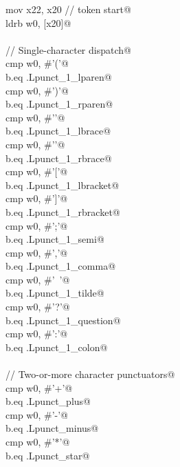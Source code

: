 \documentclass[11pt,a4paper,twoside,openright,DIV=15]{scrbook}
\theoremstyle{definition}
\theoremstyle{plain}
\theoremstyle{remark}
\begin{document}
\begin{flushleft}
\begin{minipage}{\linewidth}
\begin{list}{}{}
\mbox{}\verb@    mov x22, x20                // token start@\\
\mbox{}\verb@    ldrb w0, [x20]@\\
\mbox{}\verb@@\\
\mbox{}\verb@    // Single-character dispatch@\\
\mbox{}\verb@    cmp w0, #'('@\\
\mbox{}\verb@    b.eq .Lpunct_1_lparen@\\
\mbox{}\verb@    cmp w0, #')'@\\
\mbox{}\verb@    b.eq .Lpunct_1_rparen@\\
\mbox{}\verb@    cmp w0, #'{'@\\
\mbox{}\verb@    b.eq .Lpunct_1_lbrace@\\
\mbox{}\verb@    cmp w0, #'}'@\\
\mbox{}\verb@    b.eq .Lpunct_1_rbrace@\\
\mbox{}\verb@    cmp w0, #'['@\\
\mbox{}\verb@    b.eq .Lpunct_1_lbracket@\\
\mbox{}\verb@    cmp w0, #']'@\\
\mbox{}\verb@    b.eq .Lpunct_1_rbracket@\\
\mbox{}\verb@    cmp w0, #';'@\\
\mbox{}\verb@    b.eq .Lpunct_1_semi@\\
\mbox{}\verb@    cmp w0, #','@\\
\mbox{}\verb@    b.eq .Lpunct_1_comma@\\
\mbox{}\verb@    cmp w0, #'~'@\\
\mbox{}\verb@    b.eq .Lpunct_1_tilde@\\
\mbox{}\verb@    cmp w0, #'?'@\\
\mbox{}\verb@    b.eq .Lpunct_1_question@\\
\mbox{}\verb@    cmp w0, #':'@\\
\mbox{}\verb@    b.eq .Lpunct_1_colon@\\
\mbox{}\verb@@\\
\mbox{}\verb@    // Two-or-more character punctuators@\\
\mbox{}\verb@    cmp w0, #'+'@\\
\mbox{}\verb@    b.eq .Lpunct_plus@\\
\mbox{}\verb@    cmp w0, #'-'@\\
\mbox{}\verb@    b.eq .Lpunct_minus@\\
\mbox{}\verb@    cmp w0, #'*'@\\
\mbox{}\verb@    b.eq .Lpunct_star@\\

\end{list}
\end{minipage}
\end{flushleft}
\end{document}
